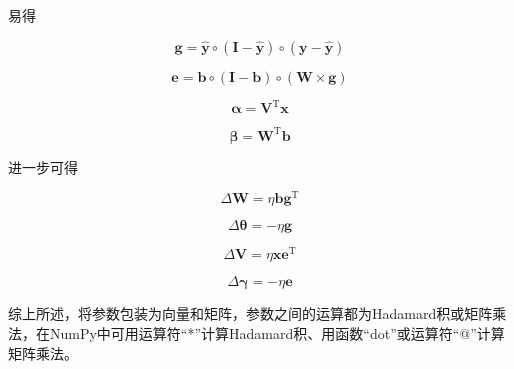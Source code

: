 \documentclass{ctexart}
\begin{document}
	易得
	
	\begin{equation}
		\bm{g}=\hat{\bm{y}}\circ (\bm{I}-\hat{\bm{y}})\circ(\bm{y}-\hat{\bm{y}})
	\end{equation}
	
	\begin{equation}
		\bm{e}=\bm{b}\circ(\bm{I}-\bm{b})\circ(\bm{W}\times \bm{g})
	\end{equation}
	
	\begin{equation}
		\bm{\alpha}=\bm{V}^\mathrm{T}\bm{x}
	\end{equation}

	\begin{equation}
		\bm{\beta}=\bm{W}^\mathrm{T}\bm{b}
	\end{equation}

	进一步可得
	
	\begin{equation}
		\Delta\bm{W}=\eta\bm{b}\bm{g}^\mathrm{T}
	\end{equation}
	
	\begin{equation}
		\Delta\bm{\theta}=-\eta\bm{g}
	\end{equation}

	\begin{equation}
		\Delta\bm{V}=\eta\bm{x}\bm{e}^\mathrm{T}
	\end{equation}

	\begin{equation}
		\Delta\bm{\gamma}=-\eta\bm{e}
	\end{equation}

	综上所述，将参数包装为向量和矩阵，参数之间的运算都为Hadamard积或矩阵乘法，在NumPy中可用运算符“*”计算Hadamard积、用函数“dot”或运算符“@”计算矩阵乘法。
	
\end{document}
